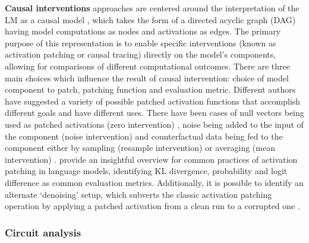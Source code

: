 \textbf{Causal interventions} approaches are centered around the interpretation of the LM as a causal model \cite{geiger2021}, which takes the form of a directed acyclic graph (DAG) having model computations as nodes and activations as edges.
The primary purpose of this representation is to enable specific interventions (known as activation patching or causal tracing) directly on the model's components, allowing for comparisons of different computational outcomes.
There are three main choices which influence the result of causal intervention: choice of model component to patch, patching function and evaluation metric.
Different authors have suggested a variety of possible patched activation functions that accomplish different goals and have different uses.
There have been cases of null vectors being used as patched activations (zero intervention) \cite{olsson2022, mohebbi2023}, noise being added to the input of the component (noise intervention) \cite{meng2022} and counterfactual data being fed to the component either by sampling (resample intervention) \cite{hanna2023, conmy2023} or averaging (mean intervention) \cite{wang2023}.
\citet{zhang2024} provide an insightful overview for common practices of activation patching in language models, identifying KL divergence, probability and logit difference as common evaluation metrics.
Additionally, it is possible to identify an alternate `denoising' setup, which subverts the classic activation patching operation by applying a patched activation from a clean run to a corrupted one \cite{lieberum2023, meng2022}.


\subsubsection{Circuit analysis}

